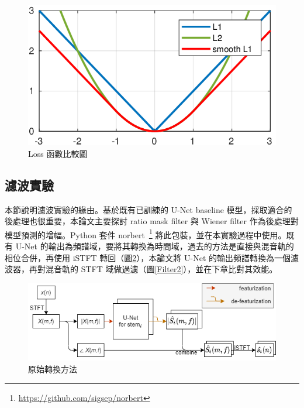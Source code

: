 \begin{figure}[htbp]
    \hfil
    \begin{minipage}[t]{0.6\textwidth}
        \includegraphics[width=\textwidth]{./figures/chapter04_experiment/xLxLoss1.png}
        \caption {Loss 函數比較圖}
        \label{xLxLoss1}
    \end{minipage}
    \hfil
\end{figure}

\subsection{濾波實驗}
本節說明濾波實驗的緣由。基於既有已訓練的 U-Net baseline 模型，採取適合的後處理也很重要，本論文主要探討 ratio mask filter 與 Wiener filter 作為後處理對模型預測的增幅。Python 套件 norbert~\cite{liutkus2019sigsep}\footnote{\url{https://github.com/sigsep/norbert}} 將此包裝，並在本實驗過程中使用。既有 U-Net 的輸出為頻譜域，要將其轉換為時間域，過去的方法是直接與混音軌的相位合併，再使用 iSTFT 轉回（圖\ref{Filter1}），本論文將 U-Net 的輸出頻譜轉換為一個濾波器，再對混音軌的 STFT 域做過濾（圖\ref{Filter2}），並在下章比對其效能。

\begin{figure}[htbp]
    \hfil
    \begin{minipage}[t]{0.8\textwidth}
        \includegraphics[width=\textwidth]{./figures/chapter04_experiment/Filter1.png}
        \caption {原始轉換方法}
        \label{Filter1}
    \end{minipage}
    \hfil
\end{figure}

